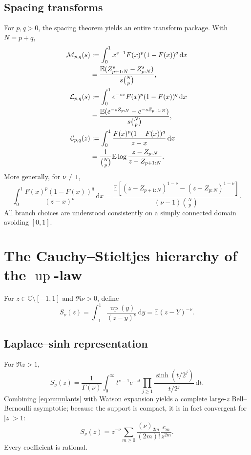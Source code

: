 \documentclass[11pt,oneside]{article}
\theoremstyle{definition}
\theoremstyle{remark}
\newcommand{\F}{F}
\newcommand{\Up}{\operatorname{up}}
\newcommand{\E}{\mathbb E}
\newcommand{\C}{\mathbb C}
\newcommand{\dd}{\,\mathrm d}
\begin{document}
\subsection{Spacing transforms}

For \(p,q>0\), the spacing theorem yields an entire transform package.  With
\(N=p+q\),
\begin{align}
 \mathcal M_{p,q}(s)
 &:=\int_0^1x^{s-1}\F(x)^p(1-\F(x))^q\dd x\notag\\
 &=\frac{\E(Z_{p+1:N}^s-Z_{p:N}^s)}{s\binom Np},\label{eq:spacingMellin}\\
 \mathcal L_{p,q}(s)
 &:=\int_0^1e^{-sx}\F(x)^p(1-\F(x))^q\dd x\notag\\
 &=\frac{\E(e^{-sZ_{p:N}}-e^{-sZ_{p+1:N}})}{s\binom Np},\label{eq:spacingLaplace}\\
 \mathcal C_{p,q}(z)
 &:=\int_0^1\frac{\F(x)^p(1-\F(x))^q}{z-x}\dd x\notag\\
 &=\frac1{\binom Np}\E\log\frac{z-Z_{p:N}}{z-Z_{p+1:N}}.\label{eq:spacingCauchy}
\end{align}
More generally, for \(\nu\ne1\),
\begin{equation}\label{eq:spacingStieltjes}
 \int_0^1\frac{\F(x)^p(1-\F(x))^q}{(z-x)^\nu}\dd x
 =\frac{\E[(z-Z_{p+1:N})^{1-\nu}-(z-Z_{p:N})^{1-\nu}]}
 {(\nu-1)\binom Np}.
\end{equation}
All branch choices are understood consistently on a simply connected domain
avoiding \([0,1]\).

\section{The Cauchy--Stieltjes hierarchy of the \(\Up\)-law}

For \(z\in\C\setminus[-1,1]\) and \(\Re\nu>0\), define
\begin{equation}\label{eq:Snu}
 S_\nu(z)=\int_{-1}^1\frac{\Up(y)}{(z-y)^\nu}\dd y
 =\E(z-Y)^{-\nu}.
\end{equation}

\subsection{Laplace--sinh representation}

For \(\Re z>1\),
\begin{equation}\label{eq:SnuLaplace}
 S_\nu(z)=\frac1{\Gamma(\nu)}
 \int_0^\infty t^{\nu-1}e^{-zt}
 \prod_{j\ge1}\frac{\sinh(t/2^j)}{t/2^j}\dd t.
\end{equation}
Combining \eqref{eq:cumulants} with Watson expansion yields a complete
large-\(z\) Bell--Bernoulli asymptotic; because the support is compact, it is in
fact convergent for \(|z|>1\):
\begin{equation}\label{eq:Snumoments}
 S_\nu(z)=z^{-\nu}
 \sum_{m\ge0}\frac{(\nu)_{2m}}{(2m)!}\frac{c_m}{z^{2m}}.
\end{equation}
Every coefficient is rational.
\end{document}
